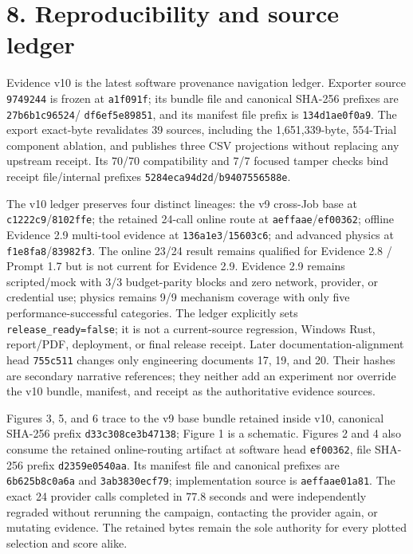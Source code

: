 \section{\texorpdfstring{\textbf{8. Reproducibility and source
ledger}}{8. Reproducibility and source ledger}}\label{reproducibility-and-source-ledger}

Evidence v10 is the latest software provenance navigation ledger. Exporter
source \texttt{9749244} is frozen at \texttt{a1f091f}; its bundle file and
canonical SHA-256 prefixes are \texttt{27b6b1c96524}/
\texttt{df6ef5e89851}, and its manifest file prefix is
\texttt{134d1ae0f0a9}. The export exact-byte revalidates 39 sources,
including the 1,651,339-byte, 554-Trial component ablation, and publishes
three CSV projections without replacing any upstream receipt. Its 70/70
compatibility and 7/7 focused tamper checks bind receipt file/internal
prefixes \texttt{5284eca94d2d}/\texttt{b9407556588e}.

The v10 ledger preserves four distinct lineages: the v9 cross-Job base at
\texttt{c1222c9}/\texttt{8102ffe}; the retained 24-call online route at
\texttt{aeffaae}/\texttt{ef00362}; offline Evidence 2.9 multi-tool evidence
at \texttt{136a1e3}/\texttt{15603c6}; and advanced physics at
\texttt{f1e8fa8}/\texttt{83982f3}. The online 23/24 result remains qualified
for Evidence 2.8 / Prompt 1.7 but is not current for Evidence 2.9. Evidence
2.9 remains scripted/mock with 3/3 budget-parity blocks and zero network,
provider, or credential use; physics remains 9/9 mechanism coverage with
only five performance-successful categories. The ledger explicitly sets
\texttt{release\_ready=false}; it is not a current-source regression,
Windows Rust, report/PDF, deployment, or final release receipt.
Later documentation-alignment head \texttt{755c511} changes only engineering
documents 17, 19, and 20. Their hashes are secondary narrative references;
they neither add an experiment nor override the v10 bundle, manifest, and
receipt as the authoritative evidence sources.

Figures 3, 5, and 6 trace to the v9 base bundle retained inside v10,
canonical SHA-256 prefix
\texttt{d33c308ce3b47138}; Figure 1 is a schematic. Figures 2 and 4 also
consume the retained online-routing artifact at software head
\texttt{ef00362}, file SHA-256 prefix \texttt{d2359e0540aa}. Its
manifest file and canonical prefixes are \texttt{6b625b8c0a6a} and
\texttt{3ab3830ecf79}; implementation source is
\texttt{aeffaae01a81}. The exact 24 provider calls completed in
77.8 seconds and were independently regraded without rerunning the
campaign, contacting the provider again, or mutating evidence. The retained
bytes remain the sole authority for every plotted selection and score alike.

